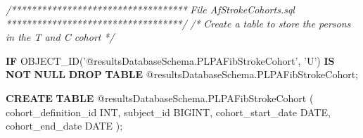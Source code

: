 \documentclass[]{book}
\newenvironment{Shaded}{\begin{snugshade}}{\end{snugshade}}
\newcommand{\KeywordTok}[1]{\textcolor[rgb]{0.13,0.29,0.53}{\textbf{#1}}}
\newcommand{\DataTypeTok}[1]{\textcolor[rgb]{0.13,0.29,0.53}{#1}}
\newcommand{\StringTok}[1]{\textcolor[rgb]{0.31,0.60,0.02}{#1}}
\newcommand{\CommentTok}[1]{\textcolor[rgb]{0.56,0.35,0.01}{\textit{#1}}}
\newcommand{\NormalTok}[1]{#1}
\begin{document}
\begin{Shaded}
\begin{Highlighting}[]
\CommentTok{/***********************************}
\CommentTok{File AfStrokeCohorts.sql }
\CommentTok{***********************************/}
\CommentTok{/*}
\CommentTok{  Create a table to store the persons in the T and C cohort}
\CommentTok{*/}

\KeywordTok{IF}\NormalTok{ OBJECT_ID(}\StringTok{'@resultsDatabaseSchema.PLPAFibStrokeCohort'}\NormalTok{, }\StringTok{'U'}\NormalTok{) }\KeywordTok{IS} \KeywordTok{NOT} \KeywordTok{NULL} 
  \KeywordTok{DROP} \KeywordTok{TABLE}\NormalTok{ @resultsDatabaseSchema.PLPAFibStrokeCohort;}

\KeywordTok{CREATE} \KeywordTok{TABLE}\NormalTok{ @resultsDatabaseSchema.PLPAFibStrokeCohort }
\NormalTok{( }
\NormalTok{  cohort_definition_id }\DataTypeTok{INT}\NormalTok{, }
\NormalTok{  subject_id BIGINT,}
\NormalTok{  cohort_start_date }\DataTypeTok{DATE}\NormalTok{, }
\NormalTok{  cohort_end_date }\DataTypeTok{DATE}
\NormalTok{);}



\end{Highlighting}
\end{Shaded}
\end{document}
